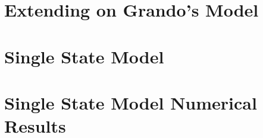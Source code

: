 \section{Extending on Grando's Model}

\section{Single State Model}

\section{Single State Model Numerical Results}
